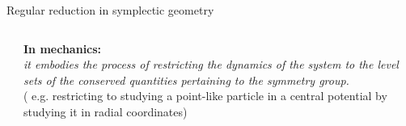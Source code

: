 \documentclass[10pt]{beamer}
\begin{document}
\begin{frame}{Regular reduction in symplectic geometry}
\begin{columns}
\begin{column}{0.40\textwidth}
          \end{column}
    
          \begin{column}{0.6\textwidth}
            \textbf{\color{UniGreen}In mechanics:}~~
            \\
            {\it \small
            it embodies the process of restricting the dynamics of the system to the level sets of the conserved quantities pertaining to the symmetry group.
            }
            \\[.2em]
            \color{gray}\small( e.g. restricting to studying a point-like particle in a central potential by studying it in radial coordinates)
          \end{column}
        \end{columns}
      \end{frame}
\end{document}
